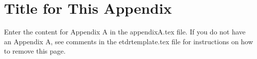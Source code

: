 
\cleardoublepage

\chapter{Title for This Appendix}

\label{Appendix:Key1}

Enter the content for Appendix A in the appendixA.tex file.  If you
do not have an Appendix A, see comments in the etdrtemplate.tex file
for instructions on how to remove this page.
